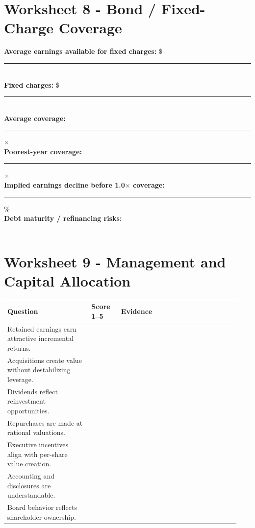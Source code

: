 \documentclass[11pt]{article}
\newcommand{\blankline}{\makebox[\linewidth][l]{\rule{0.96\linewidth}{0.35pt}}}
\begin{document}
\section{Worksheet 8 - Bond / Fixed-Charge Coverage}
\begin{worksheetbox}[Coverage]
\textbf{Average earnings available for fixed charges:} \$\rule{1.8in}{0.35pt}\\[8pt]
\textbf{Fixed charges:} \$\rule{1.8in}{0.35pt}\\[8pt]
\textbf{Average coverage:} \rule{1.2in}{0.35pt}$\times$\\[8pt]
\textbf{Poorest-year coverage:} \rule{1.2in}{0.35pt}$\times$\\[8pt]
\textbf{Implied earnings decline before 1.0$\times$ coverage:} \rule{1.2in}{0.35pt}\%\\[8pt]
\textbf{Debt maturity / refinancing risks:}\\[4pt]\blankline\\[10pt]\blankline
\end{worksheetbox}

\section{Worksheet 9 - Management and Capital Allocation}
\begin{longtable}{@{}p{0.34\linewidth}p{0.12\linewidth}p{0.48\linewidth}@{}}
\toprule
\textbf{Question} & \textbf{Score 1--5} & \textbf{Evidence}\\
\midrule
Retained earnings earn attractive incremental returns.&&\\[12pt]
Acquisitions create value without destabilizing leverage.&&\\[12pt]
Dividends reflect reinvestment opportunities.&&\\[12pt]
Repurchases are made at rational valuations.&&\\[12pt]
Executive incentives align with per-share value creation.&&\\[12pt]
Accounting and disclosures are understandable.&&\\[12pt]
Board behavior reflects shareholder ownership.&&\\[12pt]
\bottomrule
\end{longtable}
\end{document}
